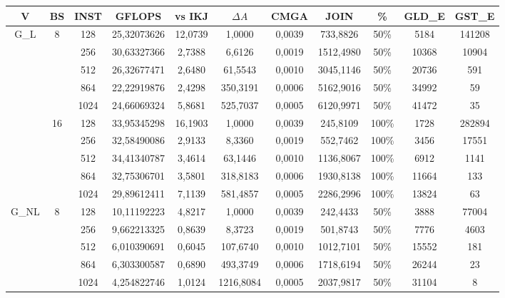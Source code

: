 \documentclass[10pt,a4paper]{article}
\begin{document}
\begin{center}
	\begin{tabular}{ |c|c|c|c|c|c|c|c|c|c|c| }
		\hline
		V & BS & INST & GFLOPS & vs IKJ & $\Delta A$ & CMGA & JOIN & \% &  GLD\_E & GST\_E \\ \hline
		G\_L   & 8  & 128  & 25,32073626 & 12,0739 & 1,0000    & 0,0039 & 733,8826   & 50\%  & 5184     & 141208  \\ \hline
		      &    & 256  & 30,63327366 & 2,7388  & 6,6126    & 0,0019 & 1512,4980  & 50\%  & 10368    & 10904   \\ \hline
		      &    & 512  & 26,32677471 & 2,6480  & 61,5543   & 0,0010 & 3045,1146  & 50\%  & 20736    & 591     \\ \hline
		      &    & 864  & 22,22919876 & 2,4298  & 350,3191  & 0,0006 & 5162,9016  & 50\%  & 34992    & 59      \\ \hline
		      &    & 1024 & 24,66069324 & 5,8681  & 525,7037  & 0,0005 & 6120,9971  & 50\%  & 41472    & 35      \\ \hline
		      & 16 & 128  & 33,95345298 & 16,1903 & 1,0000    & 0,0039 & 245,8109   & 100\% & 1728     & 282894  \\ \hline
		      &    & 256  & 32,58490086 & 2,9133  & 8,3360    & 0,0019 & 552,7462   & 100\% & 3456     & 17551   \\ \hline
		      &    & 512  & 34,41340787 & 3,4614  & 63,1446   & 0,0010 & 1136,8067  & 100\% & 6912     & 1141    \\ \hline
		      &    & 864  & 32,75306701 & 3,5801  & 318,8183  & 0,0006 & 1930,8138  & 100\% & 11664    & 133     \\ \hline
		      &    & 1024 & 29,89612411 & 7,1139  & 581,4857  & 0,0005 & 2286,2996  & 100\% & 13824    & 63      \\ \hline
		G\_NL  & 8  & 128  & 10,11192223 & 4,8217  & 1,0000    & 0,0039 & 242,4433   & 50\%  & 3888     & 77004   \\ \hline
		      &    & 256  & 9,662213325 & 0,8639  & 8,3723    & 0,0019 & 501,8743   & 50\%  & 7776     & 4603    \\ \hline
		      &    & 512  & 6,010390691 & 0,6045  & 107,6740  & 0,0010 & 1012,7101  & 50\%  & 15552    & 181     \\ \hline
		      &    & 864  & 6,303300587 & 0,6890  & 493,3749  & 0,0006 & 1718,6194  & 50\%  & 26244    & 23      \\ \hline
		      &    & 1024 & 4,254822746 & 1,0124  & 1216,8084 & 0,0005 & 2037,9817  & 50\%  & 31104    & 8       \\ \hline

\end{tabular}
\end{center}
\end{document}
